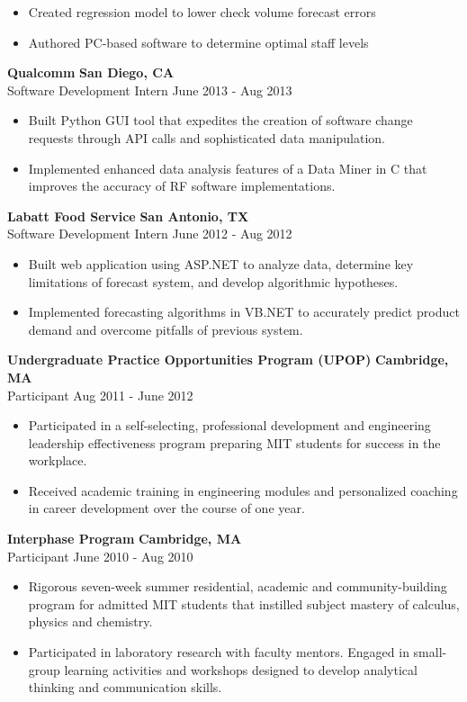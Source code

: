\documentclass{res}
\begin{document}
\begin{resume}
\begin{itemize}
 \item Created regression model to lower check volume 
                 forecast errors
 \item Authored PC-based software to determine optimal 
                 staff levels 
 \end{itemize}

 {\bf Qualcomm} \hfill {\bf San Diego, CA} \\
Software Development Intern \hfill June 2013 - Aug 2013 
 \begin{itemize} \itemsep -2pt  %
 \item Built Python GUI tool that expedites the creation of software 
	change requests through API calls and sophisticated data manipulation.
 \item Implemented enhanced data analysis features of a Data Miner in C that
	 improves the accuracy of RF software implementations.
 \end{itemize}

 {\bf Labatt Food Service} \hfill {\bf San Antonio, TX} \\
Software Development Intern \hfill June 2012 - Aug 2012 
 \begin{itemize} \itemsep -2pt  %
 \item Built web application using ASP.NET to analyze data, determine key limitations of
	forecast system, and develop algorithmic hypotheses.
 \item Implemented forecasting algorithms in VB.NET to accurately predict product demand
	and overcome pitfalls of previous system.
 \end{itemize}

 {\bf Undergraduate Practice Opportunities Program (UPOP)} \hfill {\bf Cambridge, MA} \\
Participant \hfill Aug 2011 - June 2012
 \begin{itemize} \itemsep -2pt  %
 \item	Participated in a self-selecting, professional development and engineering leadership effectiveness program preparing MIT students for success in the workplace.
 \item Received academic training in engineering modules and personalized coaching in career development over the course of one year. 
 \end{itemize}

 {\bf Interphase Program} \hfill {\bf Cambridge, MA} \\
Participant \hfill June 2010 - Aug 2010 
 \begin{itemize} \itemsep -2pt  %
 \item	Rigorous seven-week summer residential, academic and community-building program for admitted MIT students that instilled subject mastery of calculus, physics and chemistry.
 \item Participated in laboratory research with faculty mentors. Engaged in small-group learning activities and workshops designed to develop analytical thinking and communication skills.
 \end{itemize}


\end{resume}
\end{document}
